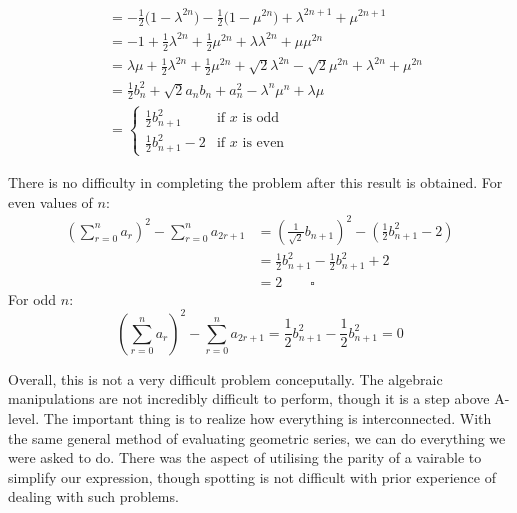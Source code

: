 \documentclass[a4paper]{article}
\begin{document}
\begin{align*}
                            & = -\frac{1}{2}\bigg(1 - \lambda^{2n}\bigg) - \frac{1}{2}\bigg(1 - \mu^{2n}\bigg) + \lambda^{2n+1} + \mu^{2n+1}                                                                                     \\
                            & = -1 + \frac{1}{2} \lambda^{2n} + \frac{1}{2} \mu^{2n} + \lambda\lambda^{2n} + \mu\mu^{2n}                                                                                                         \\
                            & = \lambda\mu + \frac{1}{2} \lambda^{2n} + \frac{1}{2} \mu^{2n} + \sqrt{2}\lambda^{2n} - \sqrt{2}\mu^{2n} + \lambda^{2n} + \mu^{2n}                                                                 \\
                            & = \frac{1}{2} b^2_n + \sqrt{2} a_n b_n + a^2_n - \lambda^n\mu^n + \lambda\mu                                                                                                                       \\
                            & =
    \begin{cases}
        \frac{1}{2} b^2_{n+1}    & \text{if } x \text{ is odd}  \\
        \frac{1}{2} b^2_{n+1} -2 & \text{if } x \text{ is even}
    \end{cases}
\end{align*}

There is no difficulty in completing the problem after this result is obtained.
For even values of $n$:
\begin{align*}
    \left(\sum_{r=0}^{n} a_r \right)^2 - \sum_{r=0}^{n} a_{2r+1} & = \left(\frac{1}{\sqrt{2}} b_{n+1}\right)^2 - \left(\frac{1}{2} b^2_{n+1} - 2\right) \\
                                                                 & = \frac{1}{2} b^2_{n+1} - \frac{1}{2} b^2_{n+1} + 2                                  \\
                                                                 & = 2 \qquad \square
\end{align*}
For odd $n$:
\begin{equation*}
    \left(\sum_{r=0}^{n} a_r \right)^2 - \sum_{r=0}^{n} a_{2r+1}  = \frac{1}{2} b^2_{n+1} - \frac{1}{2} b^2_{n+1} = 0
\end{equation*}

Overall, this is not a very difficult problem conceputally.
The algebraic manipulations are not incredibly difficult to perform, though it is a step above A-level.
The important thing is to realize how everything is interconnected.
With the same general method of evaluating geometric series, we can do everything we were asked to do.
There was the aspect of utilising the parity of a vairable to simplify our expression, though spotting is not difficult with prior experience of dealing with such problems.
\end{document}
